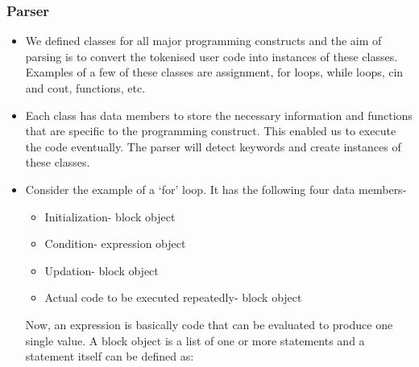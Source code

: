 \documentclass{article}
\begin{document}
\subsubsection{Parser}
\begin{itemize}
\item We defined classes for all major programming constructs and the aim of parsing is to convert the tokenised user code into instances of these classes. Examples of a few of these classes are assignment, for loops, while loops, cin and cout, functions, etc.
\item Each class has data members to store the necessary information and functions that are specific to the programming construct. This  enabled us to execute the code eventually. The parser will detect keywords and create instances of these classes.
\item Consider the example of a `for' loop. It has the following four data members-
\begin{itemize}
\item Initialization- block object
\item Condition- expression object
\item Updation- block object
\item Actual code to be executed repeatedly- block object
\end{itemize}
Now, an expression is basically code that can be evaluated to produce one single value. A block object is a list of one or more statements and a statement itself can be defined as:



\end{itemize}
\end{document}
